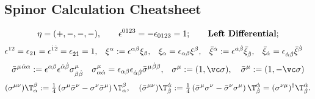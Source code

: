 \subsection{Spinor Calculation Cheatsheet}
\begin{preposition}{}\vspace{-.5zw}
\begin{align*}
 \eta = (+,-,-,-),\qquad\epsilon^{0123}=-\epsilon_{0123} = 1;\qquad \text{\bf Left Differential};
\end{align*}\vspace{-3zw}
\begin{align*}
  \epsilon^{12}=\epsilon_{21}=\epsilon^{\dot1\dot2}=\epsilon_{\dot2\dot1}&=1,&
\xi^\alpha&:=\epsilon^{\alpha\beta}\xi_\beta,& \xi_\alpha&=\epsilon_{\alpha\beta}\xi^\beta,&
\bar\xi^{\dot\alpha}&:=\epsilon^{{\dot\alpha}{\dot\beta}}\bar\xi_{\dot\beta},& \bar\xi_{\dot\alpha}&=\epsilon_{{\dot\alpha}{\dot\beta}}\bar\xi^{\dot\beta}
\end{align*}\vspace{-3zw}
\begin{align*}
  \bSm{}^{\dalpha\alpha} &:= \epsilon^{\alpha\beta}\epsilon^{\dalpha\dbeta}\Sm_{\beta\dbeta}&
 \Sm_{\alpha\dalpha}&= \epsilon_{\alpha\beta}\epsilon_{\dalpha\dbeta}\bSm{}^{\dbeta\beta},&
 \Sm:=(1,\vc\sigma),\quad\bSm:=(1,-\vc\sigma)
\end{align*}\vspace{-3zw}
\begin{align*}
  (\Smn)\T_\alpha^\beta:=\tfrac14\left(\Sm\bSn-\Sn\bSm\right)\T_{\alpha}^\beta,\quad
 (\bSmn)\T^\dalpha_\dbeta:=\tfrac14\left(\bSm\Sn-\bSn\Sm\right)\T^{\dalpha}_\dbeta =
(\Snm)^\dagger{}\T^\dalpha_\dbeta.
\end{align*}\vspace{-3zw}
\end{preposition}\vspace{-1.2zw}

